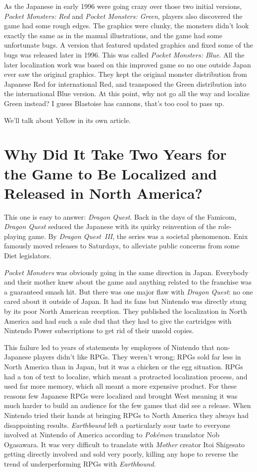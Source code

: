 \documentclass{book}
\begin{document}
As the Japanese in early 1996 were going crazy over those two initial versions, \emph{Pocket Monsters: Red} and \emph{Pocket Monsters: Green}, players also discovered the game had some rough edges. The graphics were clunky, the monsters didn’t look exactly the same as in the manual illustrations, and the game had some unfortunate bugs. A version that featured updated graphics and fixed some of the bugs was released later in 1996. This was called \emph{Pocket Monsters: Blue}. All the later localization work was based on this improved game so no one outside Japan ever saw the original graphics. They kept the original monster distribution from Japanese Red for international Red, and transposed the Green distribution into the international Blue version. At this point, why not go all the way and localize Green instead? I guess Blastoise has cannons, that’s too cool to pass up.

We’ll talk about Yellow in its own article.

\FloatBarrier\needspace{5pt}\section*{Why Did It Take Two Years for the Game to Be Localized and Released in North America?}\nopagebreak[4]

This one is easy to answer: \emph{Dragon Quest}. Back in the days of the Famicom, \emph{Dragon Quest} seduced the Japanese with its quirky reinvention of the role-playing game. By \emph{Dragon Quest III}, the series was a societal phenomenon. Enix famously moved releases to Saturdays, to alleviate public concerns from some Diet legislators.

\emph{Pocket Monsters} was obviously going in the same direction in Japan. Everybody and their mother knew about the game and anything related to the franchise was a guaranteed smash hit. But there was one major flaw with \emph{Dragon Quest}: no one cared about it outside of Japan. It had its fans but Nintendo was directly stung by its poor North American reception. They published the localization in North America and had such a sale dud that they had to give the cartridges with Nintendo Power subscriptions to get rid of their unsold copies.

This failure led to years of statements by employees of Nintendo that non-Japanese players didn’t like RPGs. They weren’t wrong; RPGs sold far less in North America than in Japan, but it was a chicken or the egg situation. RPGs had a ton of text to localize, which meant a protracted localization process, and used far more memory, which all meant a more expensive product. For these reasons few Japanese RPGs were localized and brought West meaning it was much harder to build an audience for the few games that did see a release. When Nintendo tried their hands at bringing RPGs to North America they always had disappointing results. \emph{Earthbound} left a particularly sour taste to everyone involved at Nintendo of America according to \emph{Pokémon} translator Nob Ogasawara. It was very difficult to translate with \emph{Mother} creator Itoi Shigesato getting directly involved and sold very poorly, killing any hope to reverse the trend of underperforming RPGs with \emph{Earthbound}.
\end{document}
